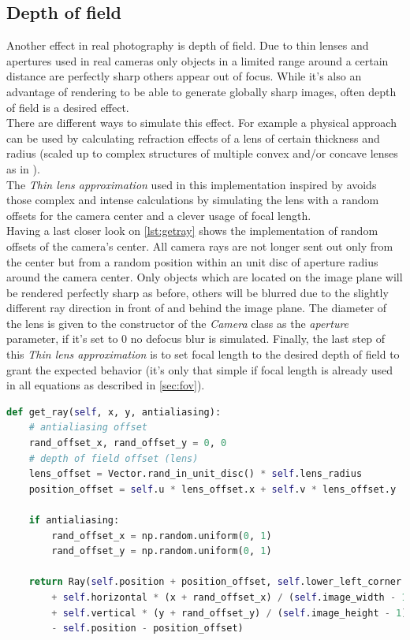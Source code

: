 \documentclass[]{article}
\begin{document}
		\subsection{Depth of field}
		\label{sec:depthoffield}
			Another effect in real photography is depth of field. Due to thin lenses and apertures used in real cameras only objects in a limited range around a certain distance are perfectly sharp others appear out of focus. While it's also an advantage of rendering to be able to generate globally sharp images, often depth of field is a desired effect. 
			\\
			There are different ways to simulate this effect. For example a physical approach can be used by calculating refraction effects of a lens of certain thickness and radius (scaled up to complex structures of multiple convex and/or concave lenses as in \cite{PBR}). 
			\\
			The \emph{Thin lens approximation} used in this implementation inspired by \cite{Shirley2020RTW1} avoids those complex and intense calculations by simulating the lens with a random offsets for the camera center and a clever usage of focal length.
			\\
			Having a last closer look on \cref{lst:getray} shows the implementation of random offsets of the camera's center. All camera rays are not longer sent out only from the center but from a random position within an unit disc of aperture radius around the camera center. Only objects which are located on the image plane will be rendered perfectly sharp as before, others will be blurred due to the slightly different ray direction in front of and behind the image plane. The diameter of the lens is given to the constructor of the \emph{Camera} class as the \emph{aperture} parameter, if it's set to 0 no defocus blur is simulated. Finally, the last step of this \emph{Thin lens approximation} is to set focal length to the desired depth of field to grant the expected behavior (it's only that simple if focal length is already used in all equations as described in \cref{sec:fov}). 
					
			\begin{lstlisting}[caption={Method to generate a ray for given pixel coordinates using antialisaing and thin lens approximation}, language=Python, label=lst:getray]
def get_ray(self, x, y, antialiasing):
	# antialiasing offset
	rand_offset_x, rand_offset_y = 0, 0
	# depth of field offset (lens)
	lens_offset = Vector.rand_in_unit_disc() * self.lens_radius
	position_offset = self.u * lens_offset.x + self.v * lens_offset.y
	
	if antialiasing:
		rand_offset_x = np.random.uniform(0, 1)
		rand_offset_y = np.random.uniform(0, 1)
	
	return Ray(self.position + position_offset, self.lower_left_corner 
		+ self.horizontal * (x + rand_offset_x) / (self.image_width - 1) 
		+ self.vertical * (y + rand_offset_y) / (self.image_height - 1) 
		- self.position - position_offset)
			\end{lstlisting}
	
\end{document}

